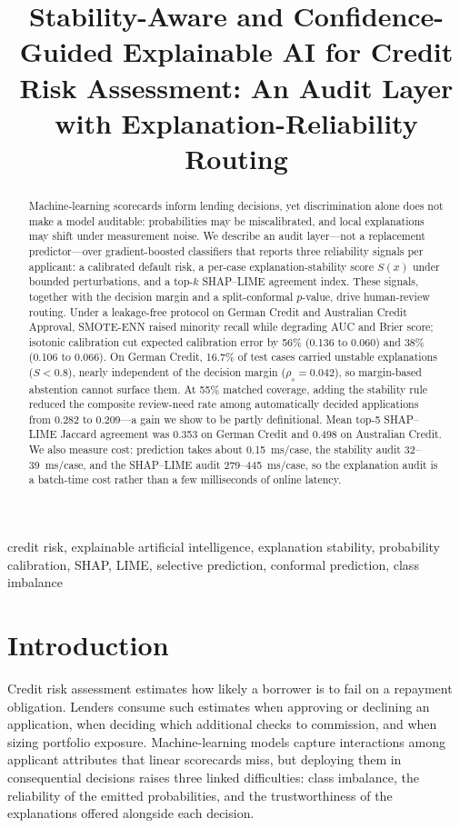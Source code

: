 \documentclass[journal]{IEEEtran}
\title{Stability-Aware and Confidence-Guided Explainable AI for
Credit Risk Assessment: An Audit Layer with Explanation-Reliability
Routing}
\author{
\IEEEauthorblockN{Jatin Sachdeva, Siddharth Singh, Gauravi Singh, and Anshika Rai}
\IEEEauthorblockA{\textit{Department of Computer Science and Engineering}\\
\textit{Kalinga Institute of Industrial Technology}\\
Bhubaneswar, India}
}
\begin{document}
\maketitle

\begin{abstract}
Machine-learning scorecards inform lending decisions, yet discrimination alone
does not make a model auditable: probabilities may be miscalibrated, and local
explanations may shift under measurement noise. We describe an audit
layer---not a replacement predictor---over gradient-boosted classifiers that
reports three reliability signals per applicant: a calibrated default risk, a
per-case explanation-stability score $S(x)$ under bounded perturbations, and a
top-$k$ SHAP--LIME agreement index. These signals, together with the decision
margin and a split-conformal $p$-value, drive human-review routing. Under a
leakage-free protocol on German Credit and Australian Credit Approval,
SMOTE-ENN raised minority recall while degrading AUC and Brier score; isotonic
calibration cut expected calibration error by 56\% (0.136 to 0.060) and 38\%
(0.106 to 0.066). On German Credit, 16.7\% of test cases carried unstable
explanations ($S<0.8$), nearly independent of the decision margin
($\rho_s=0.042$), so margin-based abstention cannot surface them. At 55\%
matched coverage, adding the stability rule reduced the composite review-need
rate among automatically decided applications from 0.282 to 0.209---a gain we
show to be partly definitional. Mean top-5 SHAP--LIME Jaccard agreement was
0.353 on German Credit and 0.498 on Australian Credit. We also measure cost:
prediction takes about 0.15~ms/case, the stability audit 32--39~ms/case, and
the SHAP--LIME audit 279--445~ms/case, so the explanation audit is a batch-time
cost rather than a few milliseconds of online latency.
\end{abstract}

\begin{IEEEkeywords}
credit risk, explainable artificial intelligence, explanation stability,
probability calibration, SHAP, LIME, selective prediction, conformal
prediction, class imbalance
\end{IEEEkeywords}

\section{Introduction}

Credit risk assessment estimates how likely a borrower is to fail on a
repayment obligation. Lenders consume such estimates when approving or
declining an application, when deciding which additional checks to commission,
and when sizing portfolio exposure. Machine-learning models capture
interactions among applicant attributes that linear scorecards miss, but
deploying them in consequential decisions raises three linked difficulties:
class imbalance, the reliability of the emitted probabilities, and the
trustworthiness of the explanations offered alongside each decision.
\end{document}
